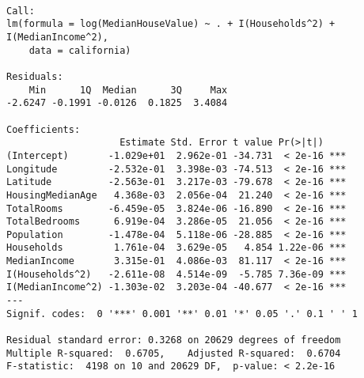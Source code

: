 \documentclass[11pt]{article}
\begin{document}
    
    \begin{verbatim}

Call:
lm(formula = log(MedianHouseValue) ~ . + I(Households^2) + I(MedianIncome^2), 
    data = california)

Residuals:
    Min      1Q  Median      3Q     Max 
-2.6247 -0.1991 -0.0126  0.1825  3.4084 

Coefficients:
                    Estimate Std. Error t value Pr(>|t|)    
(Intercept)       -1.029e+01  2.962e-01 -34.731  < 2e-16 ***
Longitude         -2.532e-01  3.398e-03 -74.513  < 2e-16 ***
Latitude          -2.563e-01  3.217e-03 -79.678  < 2e-16 ***
HousingMedianAge   4.368e-03  2.056e-04  21.240  < 2e-16 ***
TotalRooms        -6.459e-05  3.824e-06 -16.890  < 2e-16 ***
TotalBedrooms      6.919e-04  3.286e-05  21.056  < 2e-16 ***
Population        -1.478e-04  5.118e-06 -28.885  < 2e-16 ***
Households         1.761e-04  3.629e-05   4.854 1.22e-06 ***
MedianIncome       3.315e-01  4.086e-03  81.117  < 2e-16 ***
I(Households^2)   -2.611e-08  4.514e-09  -5.785 7.36e-09 ***
I(MedianIncome^2) -1.303e-02  3.203e-04 -40.677  < 2e-16 ***
---
Signif. codes:  0 '***' 0.001 '**' 0.01 '*' 0.05 '.' 0.1 ' ' 1

Residual standard error: 0.3268 on 20629 degrees of freedom
Multiple R-squared:  0.6705,	Adjusted R-squared:  0.6704 
F-statistic:  4198 on 10 and 20629 DF,  p-value: < 2.2e-16

    \end{verbatim}
\end{document}
